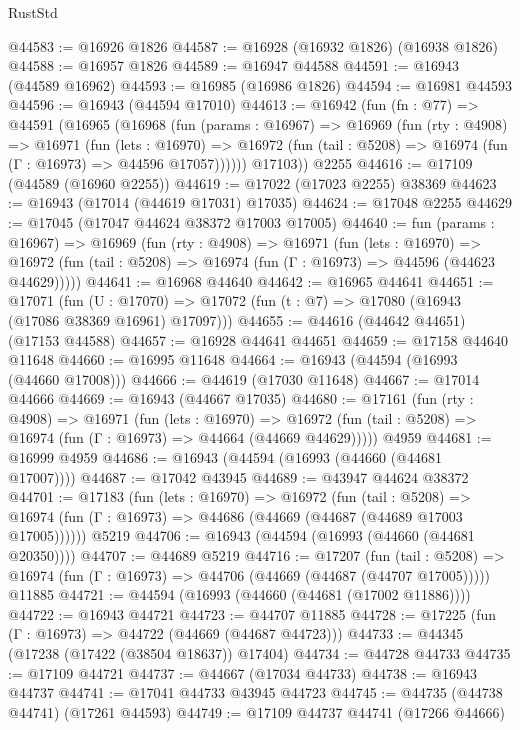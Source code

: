 \begin{lexlean}{RustStd}
\begin{coremodule}
@44583 := @16926 @1826
@44587 := @16928 (@16932 @1826) (@16938 @1826)
@44588 := @16957 @1826
@44589 := @16947 @44588
@44591 := @16943 (@44589 @16962)
@44593 := @16985 (@16986 @1826)
@44594 := @16981 @44593
@44596 := @16943 (@44594 @17010)
@44613 := @16942
    (fun (fn : @77) =>
    @44591
      (@16965
        (@16968
          (fun (params : @16967) =>
          @16969
            (fun (rty : @4908) =>
            @16971
              (fun (lets : @16970) =>
              @16972 (fun (tail : @5208) => @16974 (fun (Γ : @16973) => @44596 @17057))))))
        @17103))
    @2255
@44616 := @17109 (@44589 (@16960 @2255))
@44619 := @17022 (@17023 @2255) @38369
@44623 := @16943 (@17014 (@44619 @17031) @17035)
@44624 := @17048 @2255
@44629 := @17045 (@17047 @44624 @38372 @17003 @17005)
@44640 := fun (params : @16967) =>
  @16969
    (fun (rty : @4908) =>
    @16971
      (fun (lets : @16970) =>
      @16972 (fun (tail : @5208) => @16974 (fun (Γ : @16973) => @44596 (@44623 @44629)))))
@44641 := @16968 @44640
@44642 := @16965 @44641
@44651 := @17071
    (fun (U : @17070) => @17072 (fun (t : @7) => @17080 (@16943 (@17086 @38369 @16961) @17097)))
@44655 := @44616 (@44642 @44651) (@17153 @44588)
@44657 := @16928 @44641 @44651
@44659 := @17158 @44640 @11648
@44660 := @16995 @11648
@44664 := @16943 (@44594 (@16993 (@44660 @17008)))
@44666 := @44619 (@17030 @11648)
@44667 := @17014 @44666
@44669 := @16943 (@44667 @17035)
@44680 := @17161
    (fun (rty : @4908) =>
    @16971
      (fun (lets : @16970) =>
      @16972 (fun (tail : @5208) => @16974 (fun (Γ : @16973) => @44664 (@44669 @44629)))))
    @4959
@44681 := @16999 @4959
@44686 := @16943 (@44594 (@16993 (@44660 (@44681 @17007))))
@44687 := @17042 @43945
@44689 := @43947 @44624 @38372
@44701 := @17183
    (fun (lets : @16970) =>
    @16972
      (fun (tail : @5208) =>
      @16974 (fun (Γ : @16973) => @44686 (@44669 (@44687 (@44689 @17003 @17005))))))
    @5219
@44706 := @16943 (@44594 (@16993 (@44660 (@44681 @20350))))
@44707 := @44689 @5219
@44716 := @17207
    (fun (tail : @5208) => @16974 (fun (Γ : @16973) => @44706 (@44669 (@44687 (@44707 @17005)))))
    @11885
@44721 := @44594 (@16993 (@44660 (@44681 (@17002 @11886))))
@44722 := @16943 @44721
@44723 := @44707 @11885
@44728 := @17225 (fun (Γ : @16973) => @44722 (@44669 (@44687 @44723)))
@44733 := @44345 (@17238 (@17422 (@38504 @18637)) @17404)
@44734 := @44728 @44733
@44735 := @17109 @44721
@44737 := @44667 (@17034 @44733)
@44738 := @16943 @44737
@44741 := @17041 @44733 @43945 @44723
@44745 := @44735 (@44738 @44741) (@17261 @44593)
@44749 := @17109 @44737 @44741 (@17266 @44666)

\end{coremodule}
\end{lexlean}
